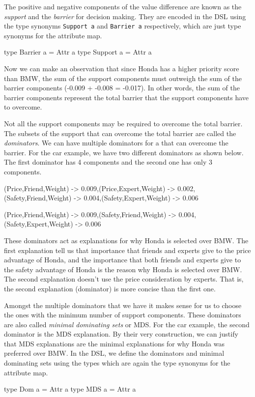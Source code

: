 \documentclass{jfp}
\newcommand{\prog}[1]{\texttt{#1}}
\begin{document}
The positive and negative components of the value difference are known as the \emph{support} and the \emph{barrier} for decision making. They are encoded in the DSL using the type synonyms \prog{Support a} and \prog{Barrier a} respectively, which are just type synonyms for the attribute map.
\begin{haskellcode}
type Barrier a = Attr a 
type Support a = Attr a 
\end{haskellcode}
Now we can make an observation that since Honda has a higher priority score than BMW, the sum of the support components must outweigh the sum of the barrier components (-0.009 + -0.008 = -0.017). In other words, the sum of the barrier components represent the total barrier that the support components have to overcome. 

Not all the support components may be required to overcome the total barrier. The subsets of the support that can overcome the total barrier are called the \emph{dominators}. We can have multiple dominators for a that can overcome the barrier. For the car example, we have two different dominators as shown below. The first dominator has 4 components and the second one has only 3 components. 
\begin{haskellcode}
{(Price,Friend,Weight) -> 0.009,(Price,Expert,Weight) -> 0.002,
 (Safety,Friend,Weight) -> 0.004,(Safety,Expert,Weight) -> 0.006}
 
 {(Price,Friend,Weight) -> 0.009,(Safety,Friend,Weight) -> 0.004,
 (Safety,Expert,Weight) -> 0.006}
\end{haskellcode}
These dominators act as explanations for why Honda is selected over BMW. The first explanation tell us that importance that friends and experts give to the price advantage of Honda, and the importance that both friends and experts give to the safety advantage of Honda is the reason why Honda is selected over BMW. The second explanation doesn't use the price consideration by experts. That is, the second explanation (dominator) is more concise than the first one. 

Amongst the multiple dominators that we have it makes sense for us to choose the ones with the minimum number of support components. These dominators are also called \emph{minimal dominating sets} or MDS. For the car example, the second dominator is the MDS explanation. By their very construction, we can justify that MDS explanations are the minimal explanations for why Honda was preferred over BMW. In the DSL, we define the dominators and minimal dominating sets using the types which are again the type synonyms for the attribute map. 
\begin{haskellcode}
type Dom a = Attr a 
type MDS a = Attr a 
\end{haskellcode}
\end{document}
